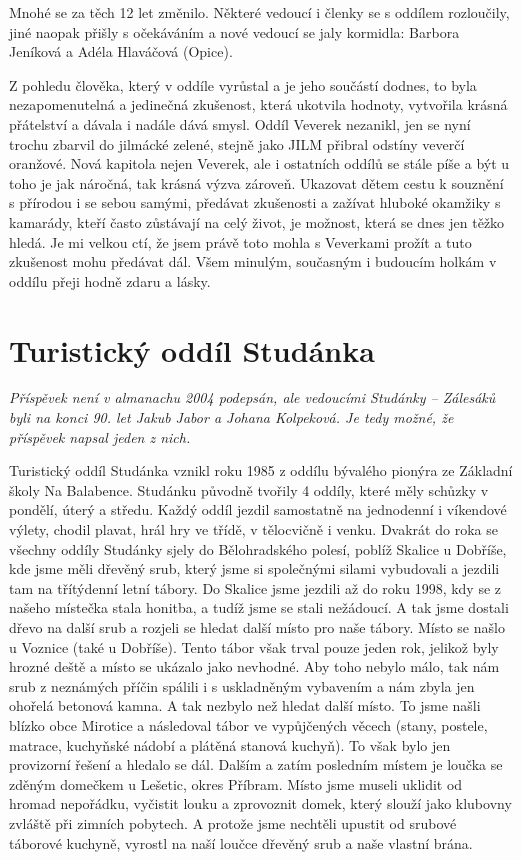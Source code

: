 Mnohé se za těch 12 let změnilo. Některé vedoucí i členky se s oddílem
rozloučily, jiné naopak přišly s očekáváním a nové vedoucí se jaly
kormidla: Barbora Jeníková a Adéla Hlaváčová (Opice).

Z pohledu člověka, který v oddíle vyrůstal a je jeho součástí dodnes, to
byla nezapomenutelná a jedinečná zkušenost, která ukotvila hodnoty,
vytvořila krásná přátelství a dávala i nadále dává smysl. Oddíl Veverek
nezanikl, jen se nyní trochu zbarvil do jilmácké zelené, stejně jako
JILM přibral odstíny veverčí oranžové. Nová kapitola nejen Veverek, ale
i ostatních oddílů se stále píše a být u toho je jak náročná, tak krásná
výzva zároveň. Ukazovat dětem cestu k souznění s přírodou i se sebou
samými, předávat zkušenosti a zažívat hluboké okamžiky s kamarády, kteří
často zůstávají na celý život, je možnost, která se dnes jen těžko
hledá. Je mi velkou ctí, že jsem právě toto mohla s Veverkami prožít a
tuto zkušenost mohu předávat dál. Všem minulým, současným i budoucím
holkám v oddílu přeji hodně zdaru a lásky.

\section{Turistický oddíl
Studánka}\label{turistickuxfd-odduxedl-studuxe1nka}

\emph{Příspěvek není v almanachu 2004 podepsán, ale vedoucími Studánky
-- Zálesáků byli na konci 90. let Jakub Jabor a Johana Kolpeková. Je
tedy možné, že příspěvek napsal jeden z nich.}

Turistický oddíl Studánka vznikl roku 1985 z oddílu bývalého pionýra ze
Základní školy Na Balabence. Studánku původně tvořily 4 oddíly, které
měly schůzky v pondělí, úterý a středu. Každý oddíl jezdil samostatně na
jednodenní i víkendové výlety, chodil plavat, hrál hry ve třídě, v
tělocvičně i venku. Dvakrát do roka se všechny oddíly Studánky sjely do
Bělohradského polesí, poblíž Skalice u Dobříše, kde jsme měli dřevěný
srub, který jsme si společnými silami vybudovali a jezdili tam na
třítýdenní letní tábory. Do Skalice jsme jezdili až do roku 1998, kdy se
z našeho místečka stala honitba, a tudíž jsme se stali nežádoucí. A tak
jsme dostali dřevo na další srub a rozjeli se hledat další místo pro
naše tábory. Místo se našlo u Voznice (také u Dobříše). Tento tábor však
trval pouze jeden rok, jelikož byly hrozné deště a místo se ukázalo jako
nevhodné. Aby toho nebylo málo, tak nám srub z neznámých příčin spálili
i s uskladněným vybavením a nám zbyla jen ohořelá betonová kamna. A tak
nezbylo než hledat další místo. To jsme našli blízko obce Mirotice a
následoval tábor ve vypůjčených věcech (stany, postele, matrace,
kuchyňské nádobí a plátěná stanová kuchyň). To však bylo jen provizorní
řešení a hledalo se dál. Dalším a zatím posledním místem je loučka se
zděným domečkem u Lešetic, okres Příbram. Místo jsme museli uklidit od
hromad nepořádku, vyčistit louku a zprovoznit domek, který slouží jako
klubovny zvláště při zimních pobytech. A protože jsme nechtěli upustit
od srubové táborové kuchyně, vyrostl na naší loučce dřevěný srub a naše
vlastní brána.

